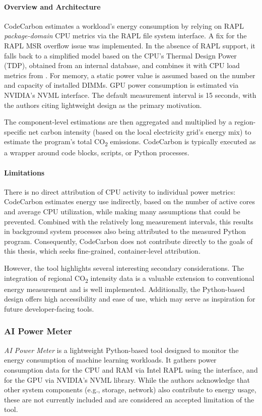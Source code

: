 \paragraph{Overview and Architecture}
CodeCarbon estimates a workload’s energy consumption by relying on RAPL \textit{package-domain} CPU metrics via the  RAPL file system interface. A fix for the RAPL MSR overflow issue was implemented\parencite{codecarbon_issue_322}. In the absence of RAPL support, it falls back to a simplified model based on the CPU’s Thermal Design Power (TDP), obtained from an internal database, and combines it with CPU load metrics from . For memory, a static power value is assumed based on the number and capacity of installed DIMMs. GPU power consumption is estimated via NVIDIA’s NVML interface. The default measurement interval is 15 seconds, with the authors citing lightweight design as the primary motivation.

The component-level estimations are then aggregated and multiplied by a region-specific net carbon intensity (based on the local electricity grid’s energy mix) to estimate the program’s total CO\textsubscript{2} emissions. CodeCarbon is typically executed as a wrapper around code blocks, scripts, or Python processes.

\paragraph{Limitations}
There is no direct attribution of CPU activity to individual power metrics: CodeCarbon estimates energy use indirectly, based on the number of active cores and average CPU utilization, while making many assumptions that could be prevented. Combined with the relatively long measurement intervals, this results in background system processes also being attributed to the measured Python program. Consequently, CodeCarbon does not contribute directly to the goals of this thesis, which seeks fine-grained, container-level attribution.

However, the tool highlights several interesting secondary considerations. The integration of regional CO\textsubscript{2} intensity data is a valuable extension to conventional energy measurement and is well implemented. Additionally, the Python-based design offers high accessibility and ease of use, which may serve as inspiration for future developer-facing tools.

\subsubsection{AI Power Meter}
\textit{AI Power Meter}\parencite{aipowermeter} is a lightweight Python-based tool designed to monitor the energy consumption of machine learning workloads. It gathers power consumption data for the CPU and RAM via Intel RAPL using the  interface, and for the GPU via NVIDIA’s NVML library. While the authors acknowledge that other system components (e.g., storage, network) also contribute to energy usage, these are not currently included and are considered an accepted limitation of the tool.

